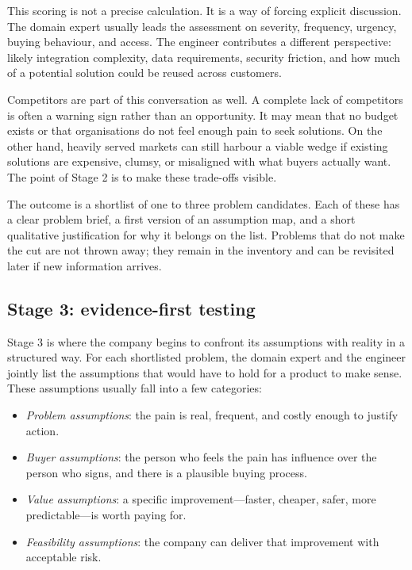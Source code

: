 \documentclass[10pt, a4paper, twocolumn]{article} %
\begin{document}
This scoring is not a precise calculation. It is a way of forcing explicit discussion. The domain expert usually leads the assessment on severity, frequency, urgency, buying behaviour, and access. The engineer contributes a different perspective: likely integration complexity, data requirements, security friction, and how much of a potential solution could be reused across customers.

Competitors are part of this conversation as well. A complete lack of competitors is often a warning sign rather than an opportunity. It may mean that no budget exists or that organisations do not feel enough pain to seek solutions. On the other hand, heavily served markets can still harbour a viable wedge if existing solutions are expensive, clumsy, or misaligned with what buyers actually want. The point of Stage 2 is to make these trade-offs visible.

The outcome is a shortlist of one to three problem candidates. Each of these has a clear problem brief, a first version of an assumption map, and a short qualitative justification for why it belongs on the list. Problems that do not make the cut are not thrown away; they remain in the inventory and can be revisited later if new information arrives.

\newpage
\subsection{Stage 3: evidence-first testing}

Stage 3 is where the company begins to confront its assumptions with reality in a structured way. For each shortlisted problem, the domain expert and the engineer jointly list the assumptions that would have to hold for a product to make sense. These assumptions usually fall into a few categories:

\begin{itemize}
  \item \emph{Problem assumptions}: the pain is real, frequent, and costly enough to justify action.
  \item \emph{Buyer assumptions}: the person who feels the pain has influence over the person who signs, and there is a plausible buying process.
  \item \emph{Value assumptions}: a specific improvement---faster, cheaper, safer, more predictable---is worth paying for.
  \item \emph{Feasibility assumptions}: the company can deliver that improvement with acceptable risk.
\end{itemize}
\end{document}
